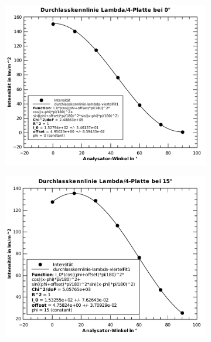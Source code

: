 \begin{figure}[H]
    \centering
    \begin{subfigure}{.45\linewidth}
        \includegraphics[width=\linewidth]{images/aufgabe-5_0grad.pdf}
        \caption{}
    \end{subfigure}
    \begin{subfigure}{.45\linewidth}
        \includegraphics[width=\linewidth]{images/aufgabe-5_15grad.pdf}
        \caption{}
    \end{subfigure}
    \begin{subfigure}{.45\linewidth}

\end{subfigure}
\end{figure}
